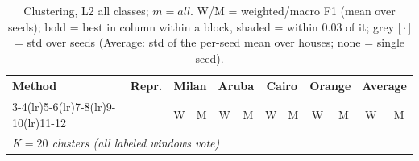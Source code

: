 \begin{table}[H]
\centering\small
\caption{Clustering, L2 all classes; $m=all$. W/M = weighted/macro F1 (mean over seeds); bold = best in column within a block, shaded = within 0.03 of it; grey [\,$\cdot$\,] = std over seeds (Average: std of the per-seed mean over houses; none = single seed).}
\label{tab:clu_l2_all_mall}
\setlength{\tabcolsep}{3.2pt}
\begin{tabular}{llcc|cc|cc|cc|cc}
\toprule
Method & Repr. & \multicolumn{2}{c}{Milan} & \multicolumn{2}{c}{Aruba} & \multicolumn{2}{c}{Cairo} & \multicolumn{2}{c}{Orange} & \multicolumn{2}{c}{Average} \\
\cmidrule(lr){3-4}\cmidrule(lr){5-6}\cmidrule(lr){7-8}\cmidrule(lr){9-10}\cmidrule(lr){11-12}
 & & W & M & W & M & W & M & W & M & W & M \\
\midrule
\multicolumn{12}{l}{\textit{$K = 20$ clusters (all labeled windows vote)}} \\
\midrule

\end{tabular}
\end{table}
